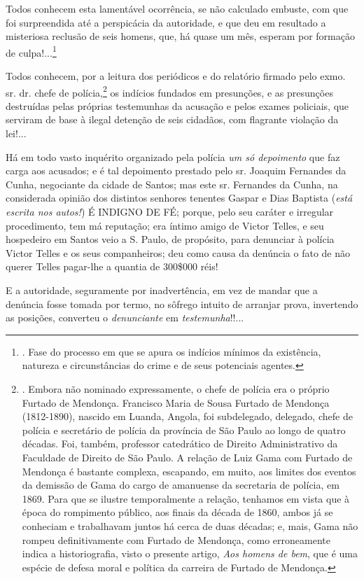 Todos conhecem esta lamentável ocorrência, se não calculado embuste, com
que foi surpreendida até a perspicácia da autoridade, e que deu em
resultado a misteriosa reclusão de seis homens, que, há quase um mês,
esperam por formação de culpa!...\footnote{. Fase do processo em que se
  apura os indícios mínimos da existência, natureza e circunstâncias do
  crime e de seus potenciais agentes.}

Todos conhecem, por a leitura dos periódicos e do relatório firmado pelo
exmo. sr. dr. chefe de polícia,\footnote{. Embora não nominado
  expressamente, o chefe de polícia era o próprio Furtado de Mendonça.
  Francisco Maria de Sousa Furtado de Mendonça (1812-1890), nascido em
  Luanda, Angola, foi subdelegado, delegado, chefe de polícia e
  secretário de polícia da província de São Paulo ao longo de quatro
  décadas. Foi, também, professor catedrático de Direito Administrativo
  da Faculdade de Direito de São Paulo. A relação de Luiz Gama com
  Furtado de Mendonça é bastante complexa, escapando, em muito, aos
  limites dos eventos da demissão de Gama do cargo de amanuense da
  secretaria de polícia, em 1869. Para que se ilustre temporalmente a
  relação, tenhamos em vista que à época do rompimento público, aos
  finais da década de 1860, ambos já se conheciam e trabalhavam juntos
  há cerca de duas décadas; e, mais, Gama não rompeu definitivamente com
  Furtado de Mendonça, como erroneamente indica a historiografia, visto
  o presente artigo, \emph{Aos homens de bem}, que é uma espécie de
  defesa moral e política da carreira de Furtado de Mendonça.} os
indícios fundados em presunções, e as presunções destruídas pelas
próprias testemunhas da acusação e pelos exames policiais, que serviram
de base à ilegal detenção de seis cidadãos, com flagrante violação da
lei!...

Há em todo vasto inquérito organizado pela polícia \emph{um só
depoimento} que faz carga aos acusados; e é tal depoimento prestado pelo
sr. Joaquim Fernandes da Cunha, negociante da cidade de Santos; mas este
sr. Fernandes da Cunha, na considerada opinião dos distintos senhores
tenentes Gaspar e Dias Baptista (\emph{está escrita nos autos!}) É
INDIGNO DE FÉ; porque, pelo seu caráter e irregular procedimento, tem má
reputação; era íntimo amigo de Victor Telles, e seu hospedeiro em Santos
veio a S. Paulo, de propósito, para denunciar à polícia Victor Telles e
os seus companheiros; deu como causa da denúncia o fato de não querer
Telles pagar-lhe a quantia de 300\$000 réis!

E a autoridade, seguramente por inadvertência, em vez de mandar que a
denúncia fosse tomada por termo, no sôfrego intuito de arranjar prova,
invertendo as posições, converteu o \emph{denunciante} em
\emph{testemunha}!!...

